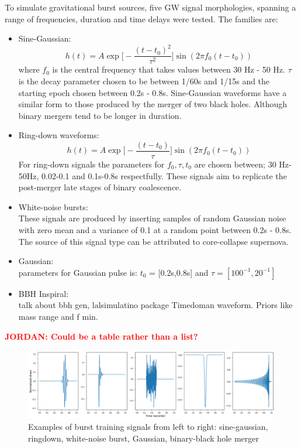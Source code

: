 \documentclass[12pt]{iopart}
\newcommand{\jordan}[1]{\textbf{\textcolor{red}{JORDAN: #1}}}
\begin{document}
To simulate gravitational burst sources, five GW signal morphologies, spanning a range of frequencies, duration and time delays were tested. The families are:
\begin{itemize}
	\item Sine-Gaussian:
		\begin{equation}
		\label{eqn:sg}
			h(t) = A \exp\bigg[ - \frac{(t-t_{0})^2}{\tau^2} \bigg] \sin (2 \pi f_0 (t-t_0))
		\end{equation}	
		where $f_0$ is the central frequency that takes values between 30 Hz - 50 Hz. $\tau$ is the decay parameter chosen to be between 1/60s  and 1/15s and the starting epoch chosen between 0.2s - 0.8s. Sine-Gaussian waveforms have a similar form to those produced by the merger of two black holes. Although binary mergers tend to be longer in duration.  		
	\item Ring-down waveforms:
		\begin{equation}
			h(t) = A \exp \bigg[-\frac{(t-t_0)}{\tau}\bigg]\sin(2 \pi f_0 (t-t_0))
		\end{equation}
		For ring-down signals the parameters for $f_0, \tau, t_0$ are chosen between; 30 Hz-50Hz, 0.02-0.1 and 0.1s-0.8s respectfully. These signals aim to replicate the post-merger late stages of binary coalescence.
	\item White-noise bursts:\hfill \\
	These signals are produced by inserting samples of random Gaussian noise with zero mean and a variance of 0.1 at a random point between 0.2s - 0.8s. The source of this signal type can be attributed to core-collapse supernova. 
	\item Gaussian:\\
	parameters for Gaussian pulse is: $t_0$ = [0.2s,0.8s] and $\tau = [100^{-1},20^{-1}]$
	\item BBH Inspiral: \\
	talk about bbh gen, lalsimulatino package Timedoman waveform. Priors like mass range and f min. 
\end{itemize}
\jordan{Could be a table rather than a list?}

\begin{figure}
    \centering
    \includegraphics[width=\textwidth]{figures/train.png}
    \caption{Examples of burst training signals from left to right: sine-gaussian, ringdown, white-noise burst, Gaussian, binary-black hole merger}
    \label{fig:train}
\end{figure}
\end{document}
